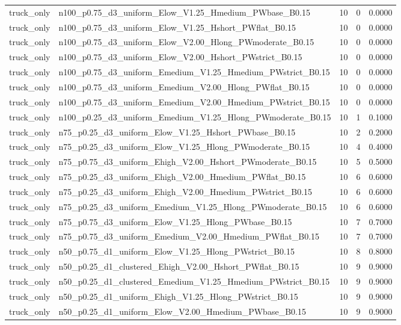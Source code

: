 \begin{tabular}{llrrr}
truck_only & n100_p0.75_d3_uniform_Elow_V1.25_Hmedium_PWbase_B0.15 & 10 & 0 & 0.0000 \\
truck_only & n100_p0.75_d3_uniform_Elow_V1.25_Hshort_PWflat_B0.15 & 10 & 0 & 0.0000 \\
truck_only & n100_p0.75_d3_uniform_Elow_V2.00_Hlong_PWmoderate_B0.15 & 10 & 0 & 0.0000 \\
truck_only & n100_p0.75_d3_uniform_Elow_V2.00_Hshort_PWstrict_B0.15 & 10 & 0 & 0.0000 \\
truck_only & n100_p0.75_d3_uniform_Emedium_V1.25_Hmedium_PWstrict_B0.15 & 10 & 0 & 0.0000 \\
truck_only & n100_p0.75_d3_uniform_Emedium_V2.00_Hlong_PWflat_B0.15 & 10 & 0 & 0.0000 \\
truck_only & n100_p0.75_d3_uniform_Emedium_V2.00_Hmedium_PWstrict_B0.15 & 10 & 0 & 0.0000 \\
truck_only & n100_p0.25_d3_uniform_Emedium_V1.25_Hlong_PWmoderate_B0.15 & 10 & 1 & 0.1000 \\
truck_only & n75_p0.25_d3_uniform_Elow_V1.25_Hshort_PWbase_B0.15 & 10 & 2 & 0.2000 \\
truck_only & n75_p0.25_d3_uniform_Elow_V1.25_Hlong_PWmoderate_B0.15 & 10 & 4 & 0.4000 \\
truck_only & n75_p0.75_d3_uniform_Ehigh_V2.00_Hshort_PWmoderate_B0.15 & 10 & 5 & 0.5000 \\
truck_only & n75_p0.25_d3_uniform_Ehigh_V2.00_Hmedium_PWflat_B0.15 & 10 & 6 & 0.6000 \\
truck_only & n75_p0.25_d3_uniform_Ehigh_V2.00_Hmedium_PWstrict_B0.15 & 10 & 6 & 0.6000 \\
truck_only & n75_p0.25_d3_uniform_Emedium_V1.25_Hlong_PWmoderate_B0.15 & 10 & 6 & 0.6000 \\
truck_only & n75_p0.75_d3_uniform_Elow_V1.25_Hlong_PWbase_B0.15 & 10 & 7 & 0.7000 \\
truck_only & n75_p0.75_d3_uniform_Emedium_V2.00_Hmedium_PWflat_B0.15 & 10 & 7 & 0.7000 \\
truck_only & n50_p0.75_d1_uniform_Elow_V1.25_Hlong_PWstrict_B0.15 & 10 & 8 & 0.8000 \\
truck_only & n50_p0.25_d1_clustered_Ehigh_V2.00_Hshort_PWflat_B0.15 & 10 & 9 & 0.9000 \\
truck_only & n50_p0.25_d1_clustered_Emedium_V1.25_Hmedium_PWstrict_B0.15 & 10 & 9 & 0.9000 \\
truck_only & n50_p0.25_d1_uniform_Ehigh_V1.25_Hlong_PWstrict_B0.15 & 10 & 9 & 0.9000 \\
truck_only & n50_p0.25_d1_uniform_Elow_V2.00_Hmedium_PWbase_B0.15 & 10 & 9 & 0.9000 \\

\end{tabular}
